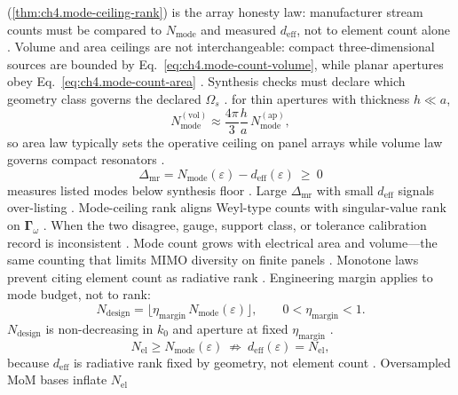 (\ref{thm:ch4.mode-ceiling-rank}) is the array honesty law: manufacturer stream counts must be compared to \(N_{\mathrm{mode}}\) and measured
\(d_{\mathrm{eff}}\), not to element count alone \cite{collin2001}. Volume and area ceilings are not interchangeable:
compact three-dimensional sources are bounded by Eq.~\eqref{eq:ch4.mode-count-volume}, while planar apertures obey
Eq.~\eqref{eq:ch4.mode-count-area} \cite{jackson1999}. Synthesis checks must declare which geometry class governs the
declared \(\Omega_{s}\) \cite{harrington2001}.
for thin apertures with thickness \(h\ll a\),
\begin{equation}
\label{eq:ch4.vol-area-dominance}
N_{\mathrm{mode}}^{\mathrm{(vol)}}\approx\frac{4\pi}{3}\frac{h}{a}\,N_{\mathrm{mode}}^{\mathrm{(ap)}},
\end{equation}
so area law typically sets the operative ceiling on panel arrays while volume law governs compact resonators \cite{collin2001}.
\begin{equation}
\label{eq:ch4.mode-rank-gap}
\Delta_{\mathrm{mr}}=N_{\mathrm{mode}}(\varepsilon)-d_{\mathrm{eff}}(\varepsilon)\ \ge\ 0
\end{equation}
measures listed modes below synthesis floor \cite{devaney2004}. Large \(\Delta_{\mathrm{mr}}\) with small \(d_{\mathrm{eff}}\) signals over-listing
\cite{stratton1941}.
Mode-ceiling rank aligns Weyl-type counts with singular-value rank on $\boldsymbol{\Gamma}_\omega$ \cite{hansen1988}. When the two disagree, gauge, support class, or tolerance calibration record is inconsistent \cite{devaney2004}.
Mode count grows with electrical area and volume---the same counting that limits MIMO diversity on finite panels \cite{stratton1941}. Monotone laws prevent citing element count as radiative rank \cite{jackson1999}.
Engineering margin applies to mode budget, not to rank:
\begin{equation}
\label{eq:ch4.mode-count-margin}
N_{\mathrm{design}}=\lfloor\eta_{\mathrm{margin}}\,N_{\mathrm{mode}}(\varepsilon)\rfloor,\qquad 0<\eta_{\mathrm{margin}}<1.
\end{equation}
\label{prop:ch4.mode-margin-monotone}
\(N_{\mathrm{design}}\) is non-decreasing in \(k_{0}\) and aperture at fixed \(\eta_{\mathrm{margin}}\) \cite{stratton1941}.
\begin{equation}
\label{eq:ch4.element-mode-inequality}
N_{\mathrm{el}}\ge N_{\mathrm{mode}}(\varepsilon)\ \not\Rightarrow\ d_{\mathrm{eff}}(\varepsilon)=N_{\mathrm{el}},
\end{equation}
because \(d_{\mathrm{eff}}\) is radiative rank fixed by geometry, not element count \cite{collin2001}. Oversampled MoM bases inflate \(N_{\mathrm{el}}\)
